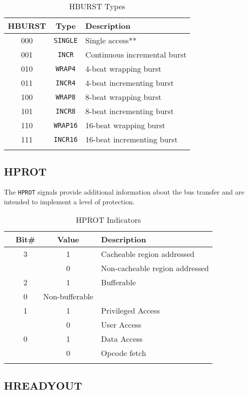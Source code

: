 \begin{longtable}[c]{@{\extracolsep{\fill}}ccl}	
		\toprule 
		\textbf{HBURST} & \textbf{Type} & \textbf{Description}\\
		\midrule
		\endhead 
		000 & \texttt{SINGLE} & Single access**\\
		001 & \texttt{INCR} & Continuous incremental burst\\
		010 & \texttt{WRAP4} & 4-beat wrapping burst\\
		011 & \texttt{INCR4} & 4-beat incrementing burst\\
		100 & \texttt{WRAP8} & 8-beat wrapping burst\\
		101 & \texttt{INCR8} & 8-beat incrementing burst\\
		110 & \texttt{WRAP16} & 16-beat wrapping burst\\
		111 & \texttt{INCR16} & 16-beat incrementing burst\\
		\bottomrule 	
	\caption{HBURST Types}
	\label{tab:HBURST}
\end{longtable}

\subsection{HPROT}

The \texttt{HPROT} signals provide additional information about the bus
transfer and are intended to implement a level of protection.

\begin{longtable}[c]{@{}lccl}	
		\toprule 
		& \textbf{Bit\#} & \textbf{Value} & \textbf{Description}\\
		\midrule
		\endhead 
		& 3 & 1 & Cacheable region addressed\\
		& & 0 & Non-cacheable region addressed\\
		& 2 & 1 & Bufferable\\
		& 0 & Non-bufferable\\
		& 1 & 1 & Privileged Access\\
		& & 0 & User Access\\
		& 0 & 1 & Data Access\\
		& & 0 & Opcode fetch\\
		\bottomrule 	
	\caption{HPROT Indicators}
	\label{tab:HPROT}
\end{longtable}

\subsection{HREADYOUT}

